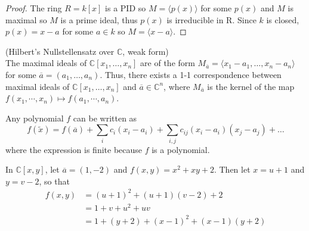 \documentclass{article}
\newenvironment{example}[1][Example.]{
  \begin{trivlist} \item[\hskip \labelsep {\bfseries #1}]
}{\end{trivlist}}
\newenvironment{theorem}[1][Theorem.]{
  \begin{trivlist} \item[\hskip \labelsep {\bfseries #1}]
}{\end{trivlist}}
\newcommand{\ang}[1]{\langle #1 \rangle}
\begin{document}
\begin{proof}
  The ring $R = k[x]$ is a PID so $M = \ang{p(x)}$ for some $p(x)$ and $M$ is
  maximal so $M$ is a prime ideal, thus $p(x)$ is irreducible in R. Since $k$ is
  closed, $p(x) = x - a$ for some $a \in k$ so $M = \ang{x - a}$.
\end{proof}
\begin{theorem} (Hilbert's Nullstellensatz over $\mathbb C$, weak form) \\
  The maximal ideals of $\mathbb C[x_1, \hdots, x_n]$ are of the form
  $M_{\overline a} = \ang{x_1 - a_1, \hdots, x_n - a_n}$ for some
  $\overline a = (a_1, \hdots, a_n)$. Thus, there exists a 1-1 correspondence
  between maximal ideals of $\mathbb C[x_1, \hdots, x_n]$ and
  $\overline a \in \mathbb C^n$, where $M_{\overline a}$ is the kernel of the
  map $f(x_1, \cdots, x_n) \mapsto f(a_1, \cdots, a_n)$.
\end{theorem}
\begin{theorem}[Sublemma.]
  Any polynomial $f$ can be written as \[
    f(\widetilde x) = f(\overline a) + \sum_{i} c_i (x_i - a_i) + \sum_{i, j} c_{ij} (x_i - a_i)(x_j - a_j) + \hdots
  \] where the expression is finite because $f$ is a polynomial.
\end{theorem}
\begin{example}
  In $\mathbb C[x,y]$, let $\overline a = (1, -2)$ and $f(x, y) = x^2 + xy + 2$.
  Then let $x = u + 1$ and $y = v - 2$, so that \begin{align*}
    f(x, y) &= (u + 1)^2 + (u + 1)(v - 2) + 2 \\
    &= 1 + v + u^2 + uv \\
    &= 1 + (y + 2) + (x-1)^2 + (x-1)(y + 2)
  \end{align*}
\end{example}
\end{document}
